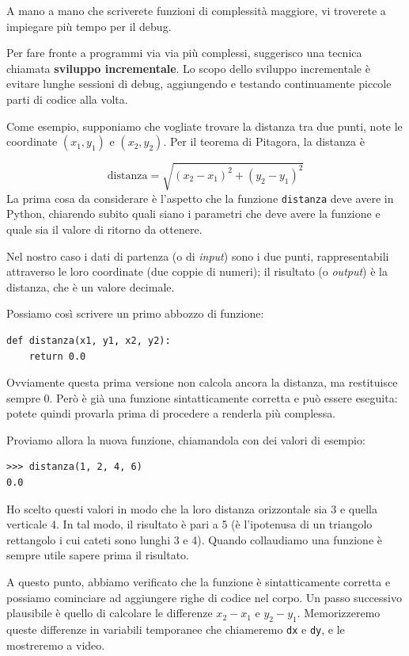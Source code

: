 \documentclass[10pt]{book}
\begin{document}
A mano a mano che scriverete funzioni di complessità maggiore, vi troverete a impiegare più tempo per il debug.

Per fare fronte a programmi via via più complessi, suggerisco una tecnica chiamata {\bf sviluppo incrementale}. Lo scopo dello sviluppo incrementale è evitare lunghe sessioni di debug, aggiungendo e testando continuamente piccole parti di codice alla volta.

Come esempio, supponiamo che vogliate trovare la distanza tra due punti, note le coordinate $(x_1, y_1)$ e $(x_2, y_2)$.
Per il teorema di Pitagora, la distanza è

\begin{displaymath}
\mathrm{distanza} = \sqrt{(x_2 - x_1)^2 + (y_2 - y_1)^2}
\end{displaymath}
%
La prima cosa da considerare è l'aspetto che la funzione {\tt distanza} deve avere in Python, chiarendo subito quali siano i parametri che deve avere la funzione e quale sia il valore di ritorno da ottenere.

Nel nostro caso i dati di partenza (o di {\em input}) sono i due punti, rappresentabili attraverso le loro coordinate (due coppie di numeri); il risultato (o {\em output}) è la distanza, che è un valore decimale.

Possiamo così scrivere un primo abbozzo di funzione:

\begin{verbatim}
def distanza(x1, y1, x2, y2):
    return 0.0
\end{verbatim}
%
Ovviamente questa prima versione non calcola ancora la distanza, ma restituisce sempre 0. Però è già una funzione sintatticamente corretta e può essere eseguita: potete quindi provarla prima di procedere a renderla più complessa.

Proviamo allora la nuova funzione, chiamandola con dei valori di esempio:

\begin{verbatim}
>>> distanza(1, 2, 4, 6)
0.0
\end{verbatim}
%
Ho scelto questi valori in modo che la loro distanza orizzontale sia 3  e quella verticale 4. In tal modo, il risultato è pari a 5 (è l'ipotenusa di un triangolo rettangolo i cui cateti sono lunghi 3 e 4). Quando collaudiamo una funzione è sempre utile sapere prima il risultato.

A questo punto, abbiamo verificato che la funzione è sintatticamente corretta e possiamo cominciare ad aggiungere righe di codice nel corpo. Un passo successivo plausibile è quello di calcolare le differenze $x_2 - x_1$ e $y_2 - y_1$.  Memorizzeremo queste differenze in variabili temporanee che chiameremo {\tt dx} e {\tt dy}, e le mostreremo a video.
\end{document}
